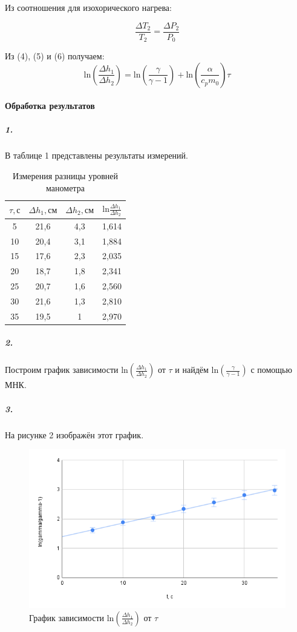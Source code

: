 \documentclass[a4paper,12pt]{article}
\begin{document}
Из соотношения для изохорического нагрева:

\begin{equation}
    \frac{\Delta T_2}{T_2}=\frac{\Delta P_2}{P_0}
\end{equation}

Из (4), (5) и (6) получаем:
\begin{equation}
    \text{ln}(\frac{\Delta h_1}{\Delta h_2})=\text{ln}(\frac{\gamma}{\gamma - 1}) + \text{ln}(\frac{\alpha}{c_p m _0})\tau
\end{equation}
\newpage
\paragraph{Обработка результатов}
\subparagraph{1.} В таблице 1 представлены результаты измерений.
\begin{table}[h]
    \centering
    \begin{tabular}{|c|c|c|c|} \hline
        $\tau, с$ &  $\Delta h_1,см$ & $\Delta h_2, см$ & $\text{ln}\frac{\Delta h_1}{\Delta h_2}$\\ \hline
        5 &  21,6 & 4,3 & 1,614 \\ \hline
        10 & 20,4 & 3,1 & 1,884 \\ \hline
        15 & 17,6 & 2,3 & 2,035 \\ \hline
        20 & 18,7 & 1,8 & 2,341 \\ \hline
        25 & 20,7 & 1,6 & 2,560 \\ \hline
        30 & 21,6 & 1,3 & 2,810 \\ \hline
        35 & 19,5 & 1 & 2,970 \\ \hline
    \end{tabular}
    \caption{Измерения разницы уровней манометра}
    \label{tab:my_label}
\end{table}
\subparagraph{2.} Построим график зависимости $\text{ln}(\frac{\Delta h_1}{\Delta h_2})$ от $\tau$ и найдём $\text{ln}(\frac{\gamma}{\gamma - 1})$ с помощью МНК.
\subparagraph{3.} На рисунке 2 изображён этот график.
\begin{figure}[h]
\centering
\includegraphics[width=0.7\linewidth]{nov.png}
\caption{График зависимости $\text{ln}(\frac{\Delta h_1}{\Delta h_2})$ от $\tau$}
\label{fig:mpr}
\end{figure} \\
\end{document}
